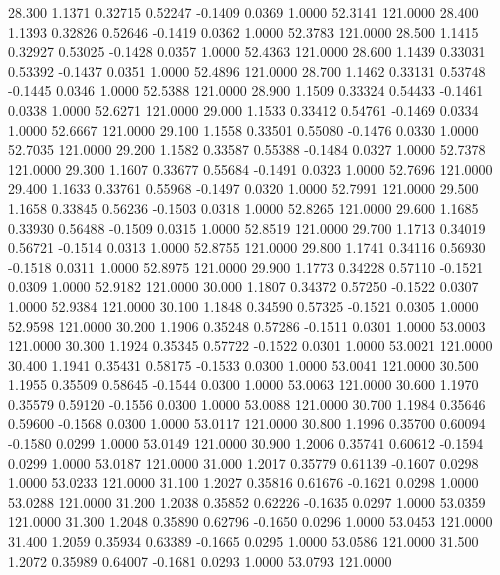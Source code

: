   28.300   1.1371   0.32715   0.52247  -0.1409   0.0369   1.0000  52.3141 121.0000
  28.400   1.1393   0.32826   0.52646  -0.1419   0.0362   1.0000  52.3783 121.0000
  28.500   1.1415   0.32927   0.53025  -0.1428   0.0357   1.0000  52.4363 121.0000
  28.600   1.1439   0.33031   0.53392  -0.1437   0.0351   1.0000  52.4896 121.0000
  28.700   1.1462   0.33131   0.53748  -0.1445   0.0346   1.0000  52.5388 121.0000
  28.900   1.1509   0.33324   0.54433  -0.1461   0.0338   1.0000  52.6271 121.0000
  29.000   1.1533   0.33412   0.54761  -0.1469   0.0334   1.0000  52.6667 121.0000
  29.100   1.1558   0.33501   0.55080  -0.1476   0.0330   1.0000  52.7035 121.0000
  29.200   1.1582   0.33587   0.55388  -0.1484   0.0327   1.0000  52.7378 121.0000
  29.300   1.1607   0.33677   0.55684  -0.1491   0.0323   1.0000  52.7696 121.0000
  29.400   1.1633   0.33761   0.55968  -0.1497   0.0320   1.0000  52.7991 121.0000
  29.500   1.1658   0.33845   0.56236  -0.1503   0.0318   1.0000  52.8265 121.0000
  29.600   1.1685   0.33930   0.56488  -0.1509   0.0315   1.0000  52.8519 121.0000
  29.700   1.1713   0.34019   0.56721  -0.1514   0.0313   1.0000  52.8755 121.0000
  29.800   1.1741   0.34116   0.56930  -0.1518   0.0311   1.0000  52.8975 121.0000
  29.900   1.1773   0.34228   0.57110  -0.1521   0.0309   1.0000  52.9182 121.0000
  30.000   1.1807   0.34372   0.57250  -0.1522   0.0307   1.0000  52.9384 121.0000
  30.100   1.1848   0.34590   0.57325  -0.1521   0.0305   1.0000  52.9598 121.0000
  30.200   1.1906   0.35248   0.57286  -0.1511   0.0301   1.0000  53.0003 121.0000
  30.300   1.1924   0.35345   0.57722  -0.1522   0.0301   1.0000  53.0021 121.0000
  30.400   1.1941   0.35431   0.58175  -0.1533   0.0300   1.0000  53.0041 121.0000
  30.500   1.1955   0.35509   0.58645  -0.1544   0.0300   1.0000  53.0063 121.0000
  30.600   1.1970   0.35579   0.59120  -0.1556   0.0300   1.0000  53.0088 121.0000
  30.700   1.1984   0.35646   0.59600  -0.1568   0.0300   1.0000  53.0117 121.0000
  30.800   1.1996   0.35700   0.60094  -0.1580   0.0299   1.0000  53.0149 121.0000
  30.900   1.2006   0.35741   0.60612  -0.1594   0.0299   1.0000  53.0187 121.0000
  31.000   1.2017   0.35779   0.61139  -0.1607   0.0298   1.0000  53.0233 121.0000
  31.100   1.2027   0.35816   0.61676  -0.1621   0.0298   1.0000  53.0288 121.0000
  31.200   1.2038   0.35852   0.62226  -0.1635   0.0297   1.0000  53.0359 121.0000
  31.300   1.2048   0.35890   0.62796  -0.1650   0.0296   1.0000  53.0453 121.0000
  31.400   1.2059   0.35934   0.63389  -0.1665   0.0295   1.0000  53.0586 121.0000
  31.500   1.2072   0.35989   0.64007  -0.1681   0.0293   1.0000  53.0793 121.0000
